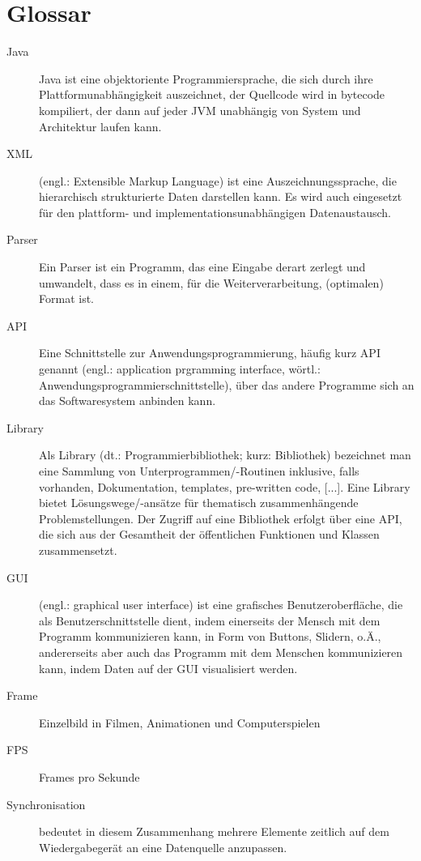\chapter{Glossar}
\begin{description}
\item [Java] Java ist eine objektoriente Programmiersprache, die sich durch ihre Plattformunabhängigkeit auszeichnet, der Quellcode wird in bytecode kompiliert, der dann auf jeder JVM unabhängig von System und Architektur laufen kann. \cite{java_def}
\item [XML] (engl.: \textsf{Extensible Markup Language}) ist eine Auszeichnungssprache, die hierarchisch strukturierte Daten darstellen kann. Es wird auch eingesetzt für den plattform- und implementationsunabhängigen Datenaustausch. \cite{xml_def}
\item [Parser] Ein Parser ist ein Programm, das eine Eingabe derart zerlegt und umwandelt, dass es in einem, für die Weiterverarbeitung, (optimalen) Format ist. \cite{parser_def}
\item [API] Eine Schnittstelle zur Anwendungsprogrammierung, häufig kurz API genannt (engl.: \textsf{application prgramming interface}, wörtl.: \textsf{Anwendungsprogrammierschnittstelle}), über das andere Programme sich an das Softwaresystem anbinden kann. \cite{api_def}
\item [Library] Als Library (dt.: \textsf{Programmierbibliothek}; kurz: \textsf{Bibliothek}) bezeichnet man eine Sammlung von Unterprogrammen/-Routinen inklusive, falls vorhanden, Dokumentation, templates, pre-written code, [...]. Eine Library bietet Lösungswege/-ansätze für thematisch zusammenhängende Problemstellungen. Der Zugriff auf eine Bibliothek erfolgt über eine API, die sich aus der Gesamtheit der öffentlichen Funktionen und Klassen zusammensetzt. \cite{lib_def1} \cite{lib_def2}
\item [GUI] (engl.: \textsf{graphical user interface}) ist eine grafisches Benutzeroberfläche, die als Benutzerschnittstelle dient, indem einerseits der Mensch mit dem Programm kommunizieren kann, in Form von Buttons, Slidern, o.Ä., andererseits aber auch das Programm mit dem Menschen kommunizieren kann, indem Daten auf der GUI visualisiert werden. \cite{gui_def}
\item [Frame] Einzelbild in Filmen, Animationen und Computerspielen
\item [FPS] Frames pro Sekunde
\item [Synchronisation] bedeutet in diesem Zusammenhang mehrere Elemente zeitlich auf dem Wiedergabegerät an eine Datenquelle anzupassen. \cite{sync_def}

\end{description}
